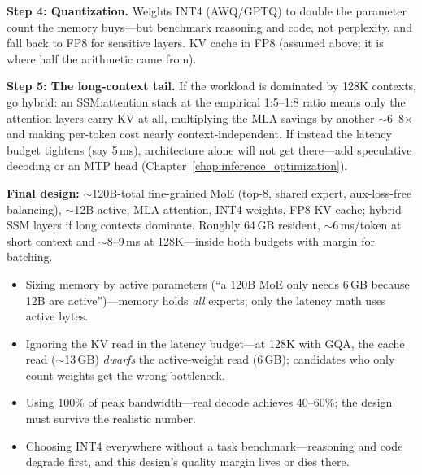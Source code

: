 \begin{interviewq}
\textbf{Step 4: Quantization.} Weights INT4 (AWQ/GPTQ) to double the parameter count the memory buys---but benchmark reasoning and code, not perplexity, and fall back to FP8 for sensitive layers. KV cache in FP8 (assumed above; it is where half the arithmetic came from).

\textbf{Step 5: The long-context tail.} If the workload is dominated by 128K contexts, go hybrid: an SSM:attention stack at the empirical 1:5--1:8 ratio means only the attention layers carry KV at all, multiplying the MLA savings by another $\sim$6--8$\times$ and making per-token cost nearly context-independent. If instead the latency budget tightens (say 5\,ms), architecture alone will not get there---add speculative decoding or an MTP head (Chapter~\ref{chap:inference_optimization}).

\textbf{Final design:} $\sim$120B-total fine-grained MoE (top-8, shared expert, aux-loss-free balancing), $\sim$12B active, MLA attention, INT4 weights, FP8 KV cache; hybrid SSM layers if long contexts dominate. Roughly 64\,GB resident, $\sim$6\,ms/token at short context and $\sim$8--9\,ms at 128K---inside both budgets with margin for batching.

\redflags
\begin{itemize}
    \item Sizing memory by active parameters (``a 120B MoE only needs 6\,GB because 12B are active'')---memory holds \textit{all} experts; only the latency math uses active bytes.
    \item Ignoring the KV read in the latency budget---at 128K with GQA, the cache read ($\sim$13\,GB) \textit{dwarfs} the active-weight read (6\,GB); candidates who only count weights get the wrong bottleneck.
    \item Using 100\% of peak bandwidth---real decode achieves 40--60\%; the design must survive the realistic number.
    \item Choosing INT4 everywhere without a task benchmark---reasoning and code degrade first, and this design's quality margin lives or dies there.
\end{itemize}



\end{interviewq}
